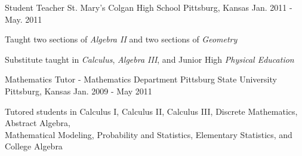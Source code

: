 \begin{cventries}
  \cventry
    {Student Teacher}
    {St. Mary's Colgan High School}
    {Pittsburg, Kansas}
    {Jan. 2011 - May. 2011}
    {
      \begin{cvitems}
        \item {Taught two sections of \textit{Algebra II} and two sections of \textit{Geometry}}
        \item {Substitute taught in \textit{Calculus}, \textit{Algebra III}, and Junior High \textit{Physical Education}}
      \end{cvitems}
    }
  \cventry
    {Mathematics Tutor - Mathematics Department}
    {Pittsburg State University}
    {Pittsburg, Kansas}
    {Jan. 2009 - May 2011}
    {
      \begin{cvitems}
        \item {Tutored students in Calculus I, Calculus II, Calculus III, Discrete Mathematics, Abstract Algebra, \\ Mathematical Modeling, Probability and Statistics, Elementary Statistics, and College Algebra}
      \end{cvitems}
    }
\end{cventries}